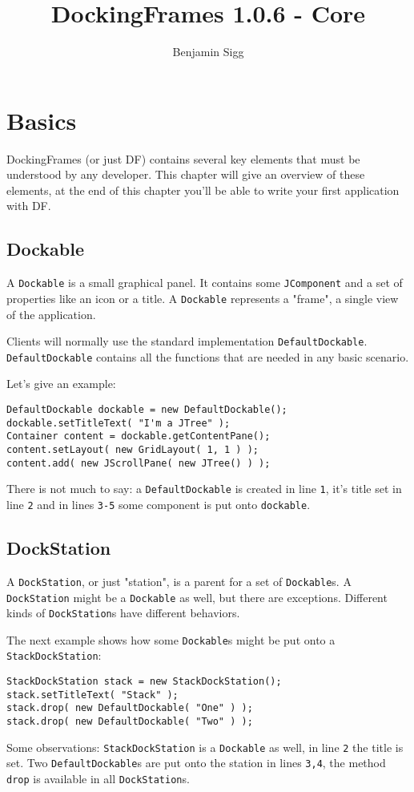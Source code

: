 \documentclass[a4paper,10pt]{article}
\title{DockingFrames 1.0.6 - Core}
\author{Benjamin Sigg}
\newcommand{\src}[1]{\lstinline[basicstyle=\normalsize\ttfamily,keywordstyle=\normalsize\ttfamily,identifierstyle=\normalsize\ttfamily]|#1|}
\begin{document}
\maketitle
\tableofcontents
\newpage

\section{Basics}
DockingFrames (or just DF) contains several key elements that must be understood by any developer. This chapter will give an overview of these elements, at the end of this chapter you'll be able to write your first application with DF.

\subsection{Dockable}
A \src{Dockable} is a small graphical panel. It contains some \src{JComponent} and a set of properties like an icon or a title. A \src{Dockable} represents a "frame", a single view of the application.

Clients will normally use the standard implementation \src{DefaultDockable}. \src{DefaultDockable} contains all the functions that are needed in any basic scenario.

Let's give an example:
\begin{lstlisting}
DefaultDockable dockable = new DefaultDockable();
dockable.setTitleText( "I'm a JTree" );
Container content = dockable.getContentPane();
content.setLayout( new GridLayout( 1, 1 ) );
content.add( new JScrollPane( new JTree() ) );
\end{lstlisting}
There is not much to say: a \src{DefaultDockable} is created in line \src{1}, it's title set in line \src{2} and in lines \src{3-5} some component is put onto \src{dockable}.

\subsection{DockStation}
A \src{DockStation}, or just "station", is a parent for a set of \src{Dockable}s. A \src{DockStation} might be a \src{Dockable} as well, but there are exceptions. Different kinds of \src{DockStation}s have different behaviors.

The next example shows how some \src{Dockable}s might be put onto a \\\src{StackDockStation}:
\begin{lstlisting}
StackDockStation stack = new StackDockStation();
stack.setTitleText( "Stack" );
stack.drop( new DefaultDockable( "One" ) );
stack.drop( new DefaultDockable( "Two" ) );
\end{lstlisting}
Some observations: \src{StackDockStation} is a \src{Dockable} as well, in line \src{2} the title is set. Two \src{DefaultDockable}s are put onto the station in lines \src{3,4}, the method \src{drop} is available in all \src{DockStation}s.
\end{document}
